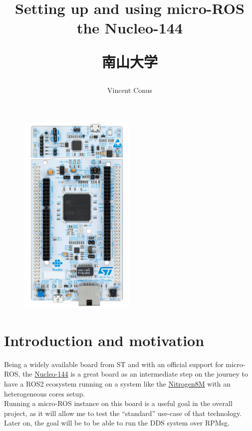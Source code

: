 \documentclass[10pt]{article}
\title{Setting up and using micro-ROS the Nucleo-144 \\[1ex] \large \begin{CJK}{UTF8}{min}南山大学\end{CJK}}
\date{}
\author{Vincent Conus}
\begin{document}
 
\maketitle

\begin{figure}[h]
  \centering
  \includegraphics[width=0.5\textwidth]{./img/board.png}
\end{figure}

\pagebreak
\section{Introduction and motivation}
Being a widely available board from ST and with an official support for micro-ROS, the \href{https://www.st.com/en/evaluation-tools/nucleo-f429zi.html}{Nucleo-144} is a great board as an intermediate step on the journey to have a ROS2 ecosystem running on a system like the \href{https://gitlab.com/nitrogen8m/documentation}{Nitrogen8M} with an heterogeneous cores setup.\\
Running a micro-ROS instance on this board is a useful goal in the overall project, as it will
allow me to test the ``standard'' use-case of that technology.\\
Later on, the goal will be to be able to run the DDS system over RPMsg.

\end{document}
